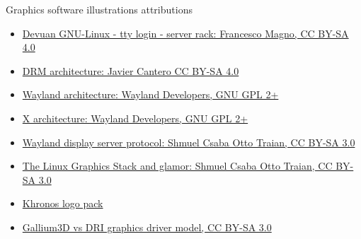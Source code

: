 \begin{frame}{Graphics software illustrations attributions}
  \small
  \begin{itemize}
  \item \href{https://commons.wikimedia.org/wiki/File:Devuan_GNU-Linux_-_tty_login_-_server_rack.jpg}{Devuan GNU-Linux - tty login - server rack: Francesco Magno, CC BY-SA 4.0}
  \item \href{https://commons.wikimedia.org/wiki/File:DRM_architecture.svg}{DRM architecture: Javier Cantero CC BY-SA 4.0}
  \item \href{https://wayland.freedesktop.org/architecture.html}{Wayland architecture: Wayland Developers, GNU GPL 2+}
  \item \href{https://wayland.freedesktop.org/architecture.html}{X architecture: Wayland Developers, GNU GPL 2+}
  \item \href{https://commons.wikimedia.org/wiki/File:Wayland_display_server_protocol.svg}{Wayland display server protocol: Shmuel Csaba Otto Traian, CC BY-SA 3.0}
  \item \href{https://commons.wikimedia.org/wiki/File:The_Linux_Graphics_Stack_and_glamor.svg}{The Linux Graphics Stack and glamor: Shmuel Csaba Otto Traian, CC BY-SA 3.0}
  \item \href{https://www.khronos.org/assets/utilities/retrieveFile.php?d=opengl&t=logopacks}{Khronos logo pack}
  \item \href{https://commons.wikimedia.org/wiki/File:Gallium3D_vs_DRI_graphics_driver_model.svg}{Gallium3D vs DRI graphics driver model, CC BY-SA 3.0}
  \end{itemize}
\end{frame}
